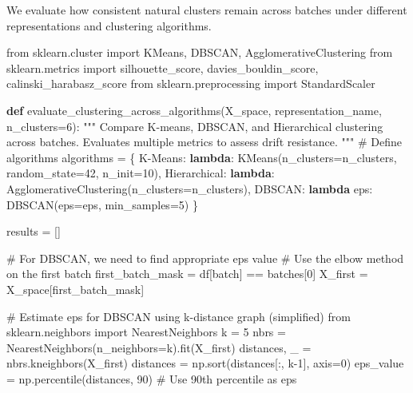\documentclass[
  letterpaper,
  DIV=11,
  numbers=noendperiod]{scrartcl}
\newenvironment{Shaded}{\begin{snugshade}}{\end{snugshade}}
\newcommand{\CommentTok}[1]{\textcolor[rgb]{0.37,0.37,0.37}{#1}}
\newcommand{\DecValTok}[1]{\textcolor[rgb]{0.68,0.00,0.00}{#1}}
\newcommand{\ImportTok}[1]{\textcolor[rgb]{0.00,0.46,0.62}{#1}}
\newcommand{\KeywordTok}[1]{\textcolor[rgb]{0.00,0.23,0.31}{\textbf{#1}}}
\newcommand{\NormalTok}[1]{\textcolor[rgb]{0.00,0.23,0.31}{#1}}
\newcommand{\OperatorTok}[1]{\textcolor[rgb]{0.37,0.37,0.37}{#1}}
\newcommand{\StringTok}[1]{\textcolor[rgb]{0.13,0.47,0.30}{#1}}
\renewenvironment{Shaded}{%
  \begin{tcolorbox}[%
    enhanced,%
    colback=codebg,%
    colframe=codebg,%
    borderline west={3pt}{0pt}{sectionblue},%
    fontupper=\small\ttfamily,%
    boxrule=0pt,%
    arc=0pt,%
    boxsep=5pt,%
    left=2mm,%
    right=2mm,%
    top=2mm,%
    bottom=2mm%
  ]%
}{%
  \end{tcolorbox}%
}
\begin{document}
We evaluate how consistent natural clusters remain across batches under
different representations and clustering algorithms.

\begin{Shaded}
\begin{Highlighting}[]
\ImportTok{from}\NormalTok{ sklearn.cluster }\ImportTok{import}\NormalTok{ KMeans, DBSCAN, AgglomerativeClustering}
\ImportTok{from}\NormalTok{ sklearn.metrics }\ImportTok{import}\NormalTok{ silhouette\_score, davies\_bouldin\_score, calinski\_harabasz\_score}
\ImportTok{from}\NormalTok{ sklearn.preprocessing }\ImportTok{import}\NormalTok{ StandardScaler}

\KeywordTok{def}\NormalTok{ evaluate\_clustering\_across\_algorithms(X\_space, representation\_name, n\_clusters}\OperatorTok{=}\DecValTok{6}\NormalTok{):}
    \CommentTok{"""}
\CommentTok{    Compare K{-}means, DBSCAN, and Hierarchical clustering across batches.}
\CommentTok{    Evaluates multiple metrics to assess drift resistance.}
\CommentTok{    """}
    \CommentTok{\# Define algorithms}
\NormalTok{    algorithms }\OperatorTok{=}\NormalTok{ \{}
        \StringTok{\textquotesingle{}K{-}Means\textquotesingle{}}\NormalTok{: }\KeywordTok{lambda}\NormalTok{: KMeans(n\_clusters}\OperatorTok{=}\NormalTok{n\_clusters, random\_state}\OperatorTok{=}\DecValTok{42}\NormalTok{, n\_init}\OperatorTok{=}\DecValTok{10}\NormalTok{),}
        \StringTok{\textquotesingle{}Hierarchical\textquotesingle{}}\NormalTok{: }\KeywordTok{lambda}\NormalTok{: AgglomerativeClustering(n\_clusters}\OperatorTok{=}\NormalTok{n\_clusters),}
        \StringTok{\textquotesingle{}DBSCAN\textquotesingle{}}\NormalTok{: }\KeywordTok{lambda}\NormalTok{ eps: DBSCAN(eps}\OperatorTok{=}\NormalTok{eps, min\_samples}\OperatorTok{=}\DecValTok{5}\NormalTok{)}
\NormalTok{    \}}
    
\NormalTok{    results }\OperatorTok{=}\NormalTok{ []}
    
    \CommentTok{\# For DBSCAN, we need to find appropriate eps value}
    \CommentTok{\# Use the elbow method on the first batch}
\NormalTok{    first\_batch\_mask }\OperatorTok{=}\NormalTok{ df[}\StringTok{\textquotesingle{}batch\textquotesingle{}}\NormalTok{] }\OperatorTok{==}\NormalTok{ batches[}\DecValTok{0}\NormalTok{]}
\NormalTok{    X\_first }\OperatorTok{=}\NormalTok{ X\_space[first\_batch\_mask]}
    
    \CommentTok{\# Estimate eps for DBSCAN using k{-}distance graph (simplified)}
    \ImportTok{from}\NormalTok{ sklearn.neighbors }\ImportTok{import}\NormalTok{ NearestNeighbors}
\NormalTok{    k }\OperatorTok{=} \DecValTok{5}
\NormalTok{    nbrs }\OperatorTok{=}\NormalTok{ NearestNeighbors(n\_neighbors}\OperatorTok{=}\NormalTok{k).fit(X\_first)}
\NormalTok{    distances, \_ }\OperatorTok{=}\NormalTok{ nbrs.kneighbors(X\_first)}
\NormalTok{    distances }\OperatorTok{=}\NormalTok{ np.sort(distances[:, k}\OperatorTok{{-}}\DecValTok{1}\NormalTok{], axis}\OperatorTok{=}\DecValTok{0}\NormalTok{)}
\NormalTok{    eps\_value }\OperatorTok{=}\NormalTok{ np.percentile(distances, }\DecValTok{90}\NormalTok{)  }\CommentTok{\# Use 90th percentile as eps}
    

\end{Highlighting}
\end{Shaded}
\end{document}
